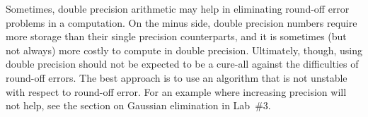 \begin{note}
  Sometimes, double precision arithmetic may help in eliminating
  round-off error problems in a computation.  
  On the minus side, double precision numbers require more storage
  than their single precision counterparts, and it is sometimes
  (but not always) more costly to compute in double precision.
  Ultimately, though, using double precision should not be expected to
  be a cure-all against the difficulties of round-off errors.
  The best approach is to use an algorithm that is not unstable with
  respect to round-off error.  For an example where increasing
  precision will not help, see the section on
  Gaussian elimination in
  Lab~\#3.  
\end{note}

